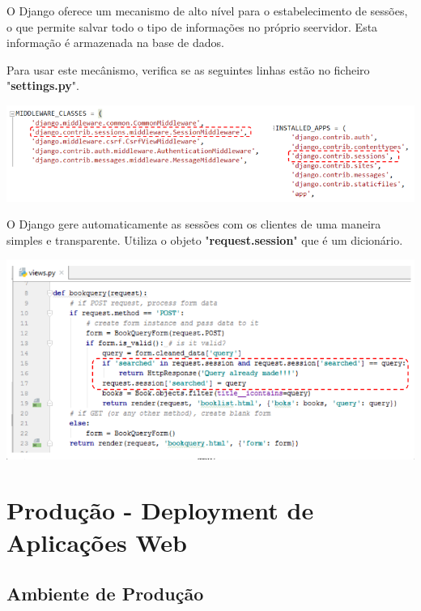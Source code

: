 \documentclass{article}
\begin{document}
\begin{flushleft}
  O Django oferece um mecanismo de alto nível para o estabelecimento de sessões,
  o que permite salvar todo o tipo de informações no próprio seervidor. Esta informação
  é armazenada na base de dados.

  \vspace{2mm}

  Para usar este mecânismo, verifica se as seguintes linhas estão no ficheiro
  "\textbf{settings.py}".

  \begin{center}
    \includegraphics[scale=0.35]{27}
  \end{center}

  O Django gere automaticamente as sessões com os clientes de uma maneira
  simples e transparente. Utiliza o objeto "\textbf{request.session}" que
  é um dicionário.

  \begin{center}
    \includegraphics[scale=0.35]{28}
  \end{center}
\end{flushleft}

\pagebreak

\section{Produção - Deployment de Aplicações Web}

\subsection{Ambiente de Produção}
\end{document}
